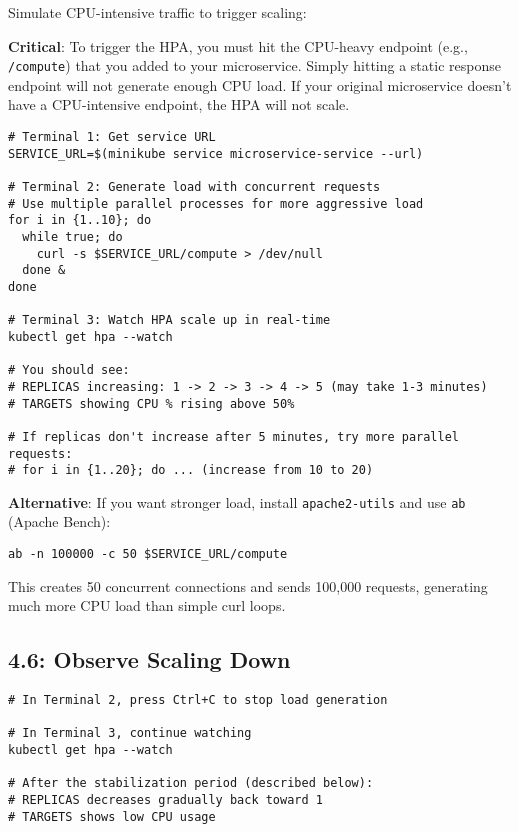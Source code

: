 \documentclass[12pt,a4paper]{article}
\begin{document}
Simulate CPU-intensive traffic to trigger scaling:

\begin{importantbox}
\textbf{Critical}: To trigger the HPA, you must hit the CPU-heavy endpoint (e.g., \texttt{/compute}) that you added to your microservice. Simply hitting a static response endpoint will not generate enough CPU load. If your original microservice doesn't have a CPU-intensive endpoint, the HPA will not scale.
\end{importantbox}

\begin{lstlisting}[caption=Generate load with curl loop on CPU-heavy endpoint]
# Terminal 1: Get service URL
SERVICE_URL=$(minikube service microservice-service --url)

# Terminal 2: Generate load with concurrent requests
# Use multiple parallel processes for more aggressive load
for i in {1..10}; do
  while true; do
    curl -s $SERVICE_URL/compute > /dev/null
  done &
done

# Terminal 3: Watch HPA scale up in real-time
kubectl get hpa --watch

# You should see:
# REPLICAS increasing: 1 -> 2 -> 3 -> 4 -> 5 (may take 1-3 minutes)
# TARGETS showing CPU % rising above 50%

# If replicas don't increase after 5 minutes, try more parallel requests:
# for i in {1..20}; do ... (increase from 10 to 20)
\end{lstlisting}

\begin{tipbox}
\textbf{Alternative}: If you want stronger load, install \texttt{apache2-utils} and use \texttt{ab} (Apache Bench):
\begin{verbatim}
ab -n 100000 -c 50 $SERVICE_URL/compute
\end{verbatim}
This creates 50 concurrent connections and sends 100,000 requests, generating much more CPU load than simple curl loops.
\end{tipbox}

\subsection{4.6: Observe Scaling Down}

\begin{lstlisting}[caption=Stop load and watch scale-down]
# In Terminal 2, press Ctrl+C to stop load generation

# In Terminal 3, continue watching
kubectl get hpa --watch

# After the stabilization period (described below):
# REPLICAS decreases gradually back toward 1
# TARGETS shows low CPU usage
\end{lstlisting}
\end{document}
